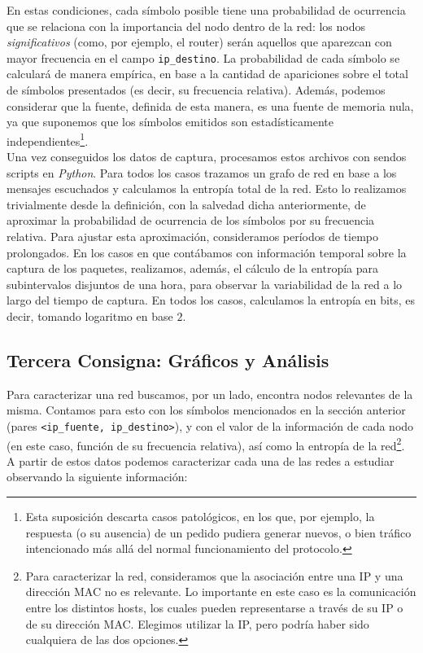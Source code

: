 En estas condiciones, cada s\'imbolo posible tiene una probabilidad de ocurrencia que se relaciona con la importancia del nodo dentro de la red: los nodos \emph{significativos} (como, por ejemplo, el router) ser\'an aquellos que aparezcan con mayor frecuencia en el campo \texttt{ip\_destino}. La probabilidad de cada s\'imbolo se calcular\'a de manera emp\'irica, en base a la cantidad de apariciones sobre el total de s\'imbolos presentados (es decir, su frecuencia relativa). Además, podemos considerar que la fuente, definida de esta manera, es una fuente de memoria nula, ya que suponemos que los s\'imbolos emitidos son estad\'isticamente independientes\footnote{Esta suposición descarta casos patológicos, en los que, por ejemplo, la respuesta (o su ausencia) de un pedido pudiera generar nuevos, o bien tráfico intencionado más allá del normal funcionamiento del protocolo.}.\\

Una vez conseguidos los datos de captura, procesamos estos archivos con sendos scripts en \emph{Python}. Para todos los casos trazamos un grafo de red en base a los mensajes escuchados y calculamos la entropía total de la red. Esto lo realizamos trivialmente desde la definición, con la salvedad dicha anteriormente, de aproximar la probabilidad de ocurrencia de los símbolos por su frecuencia relativa. Para ajustar esta aproximación, consideramos períodos de tiempo prolongados. En los casos en que contábamos con información temporal sobre la captura de los paquetes, realizamos, además, el cálculo de la entropía para subintervalos disjuntos de una hora, para observar la variabilidad de la red a lo largo del tiempo de captura. En todos los casos, calculamos la entropía en bits, es decir, tomando logaritmo en base $2$.

\subsection{Tercera Consigna: Gr\'aficos y An\'alisis}

Para caracterizar una red buscamos, por un lado, encontra nodos relevantes de la misma. Contamos para esto con los s\'imbolos mencionados en la secci\'on anterior (pares \texttt{<ip\_fuente, ip\_destino>}), y con el valor de la informaci\'on de cada nodo (en este caso, función de su frecuencia relativa), así como la entrop\'ia de la red\footnote{Para caracterizar la red, consideramos que la asociaci\'on entre una IP y una direcci\'on MAC no es relevante. Lo importante en este caso es la comunicaci\'on entre los distintos hosts, los cuales pueden representarse a trav\'es de su IP o de su direcci\'on MAC. Elegimos utilizar la IP, pero podr\'ia haber sido cualquiera de las dos opciones.}. A partir de estos datos podemos caracterizar cada una de las redes a estudiar observando la siguiente informaci\'on:

